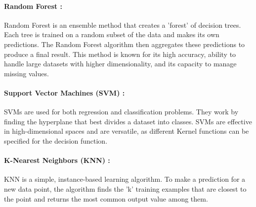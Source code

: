         \paragraph{\textbf{Random Forest\cite{probst_hyperparameters_2019} :}}
        Random Forest is an ensemble method that creates a 'forest' of decision trees. Each tree is trained on a random subset of the data and makes its own predictions. The Random Forest algorithm then aggregates these predictions to produce a final result. This method is known for its high accuracy, ability to handle large datasets with higher dimensionality, and its capacity to manage missing values.
        
        \paragraph{\textbf{Support Vector Machines (SVM)\cite{wu_analysis_2006} :}}
        SVMs are used for both regression and classification problems. They work by finding the hyperplane that best divides a dataset into classes. SVMs are effective in high-dimensional spaces and are versatile, as different Kernel functions can be specified for the decision function.
        
        \paragraph{\textbf{K-Nearest Neighbors (KNN)\cite{laaksonen_classification_1996} :}}
        KNN is a simple, instance-based learning algorithm. To make a prediction for a new data point, the algorithm finds the 'k' training examples that are closest to the point and returns the most common output value among them.